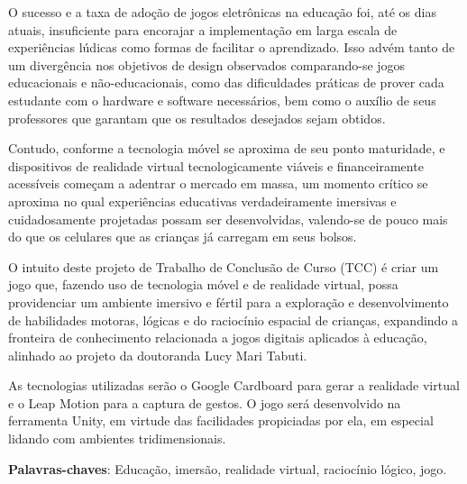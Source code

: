 \begin{resumo}
\begin{comment}
O resumo deve ser redigido, preferencialmente, na terceira pessoa do singular com verbo na voz ativa, em parágrafo único, e conter no máximo 500 palavras.
\end{comment}

O sucesso e a taxa de adoção de jogos eletrônicas na educação foi, 
até os dias atuais, insuficiente para encorajar a implementação 
em larga escala de experiências lúdicas como formas de facilitar 
o aprendizado. Isso advém tanto de um divergência nos objetivos 
de design observados comparando-se jogos educacionais e 
não-educacionais, como das dificuldades práticas de prover 
cada estudante com o hardware e software necessários, bem como 
o auxílio de seus professores que garantam que os resultados 
desejados sejam obtidos.

Contudo, conforme a tecnologia móvel se aproxima de seu ponto 
maturidade, e dispositivos de realidade virtual tecnologicamente 
viáveis e financeiramente acessíveis começam a adentrar o 
mercado em massa, um momento crítico se aproxima no qual 
experiências educativas verdadeiramente imersivas e cuidadosamente 
projetadas possam ser desenvolvidas, valendo-se de pouco mais 
do que os celulares que as crianças já carregam em seus bolsos.

O intuito deste projeto de Trabalho de Conclusão de Curso 
(TCC) é criar um jogo que, fazendo uso de tecnologia móvel 
e de realidade virtual, possa providenciar um ambiente 
imersivo e fértil para a exploração e desenvolvimento de 
habilidades motoras, lógicas e do raciocínio espacial de 
crianças, expandindo a fronteira de conhecimento relacionada 
a jogos digitais aplicados à educação, alinhado ao projeto 
da doutoranda Lucy Mari Tabuti.

As tecnologias utilizadas serão o Google Cardboard para 
gerar a realidade virtual e o Leap Motion para a captura 
de gestos. O jogo será desenvolvido na ferramenta Unity, 
em virtude das facilidades propiciadas por ela, em 
especial lidando com ambientes tridimensionais.

 \vspace{\onelineskip}

 \noindent
 \textbf{Palavras-chaves}: Educação, imersão, realidade virtual, raciocínio lógico, jogo.
\end{resumo}
 
